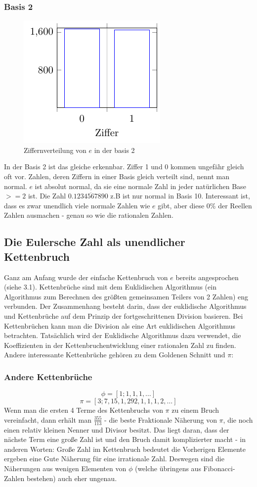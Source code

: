 \subsubsection{Basis 2}
\begin{figure}[h]
  \includegraphics{medien2/basis2/basis2.pdf}
  \centering
  \caption{Ziffernverteilung von $e$ in der basis 2}
\end{figure}
In der Basis 2 ist das gleiche erkennbar. Ziffer 1 und 0 kommen ungefähr gleich oft vor. 
Zahlen, deren Ziffern in einer Basis gleich verteilt sind, nennt man normal. $e$ ist absolut normal, da sie eine normale Zahl in jeder natürlichen Base $>= 2$ ist. Die Zahl $0.\overline{1234567890}$ z.B ist nur normal in Basis 10. Interessant ist, dass es zwar unendlich viele normale Zahlen wie $e$ gibt, aber diese 0\% der Reellen Zahlen ausmachen - genau so wie die rationalen Zahlen.
\subsection{Die Eulersche Zahl als unendlicher Kettenbruch}
Ganz am Anfang wurde der einfache Kettenbruch von $e$ bereits angesprochen (siehe 3.1). Kettenbrüche sind mit dem Euklidischen Algorithmus (ein Algorithmus zum Berechnen des größten gemeinsamen Teilers von 2 Zahlen) eng verbunden. Der Zusammenhang besteht darin, dass der euklidische Algorithmus und Kettenbrüche auf dem Prinzip der fortgeschrittenen Division basieren. Bei Kettenbrüchen kann man die Division als eine Art euklidischen Algorithmus betrachten. Tatsächlich wird der Euklidische Algorithmus dazu verwendet, die Koeffizienten in der Kettenbruchentwicklung einer rationalen Zahl zu finden. Andere interessante Kettenbrüche gehören zu dem Goldenen Schnitt und $\pi$: 
\subsubsection{Andere Kettenbrüche}
\[\phi = [1; 1, 1, 1, \dots]
\]\[\pi =[3; 7, 15 , 1, 292, 1, 1, 1, 2,\dots]
\]Wenn man die ersten 4 Terme des Kettenbruchs von $\pi$ zu einem Bruch vereinfacht, dann erhält man $\frac{355}{113}$ - die beste Fraktionale Näherung von $\pi$, die noch einen relativ kleinen Nenner und Divisor besitzt. Das liegt daran, dass der nächste Term eine große Zahl ist und den Bruch damit komplizierter macht - in anderen Worten: Große Zahl im Kettenbruch bedeutet die Vorherigen Elemente ergeben eine Gute Näherung für eine irrationale Zahl. Deswegen sind die Näherungen aus wenigen Elementen von $\phi$ (welche übringens aus Fibonacci-Zahlen bestehen) auch eher ungenau.
